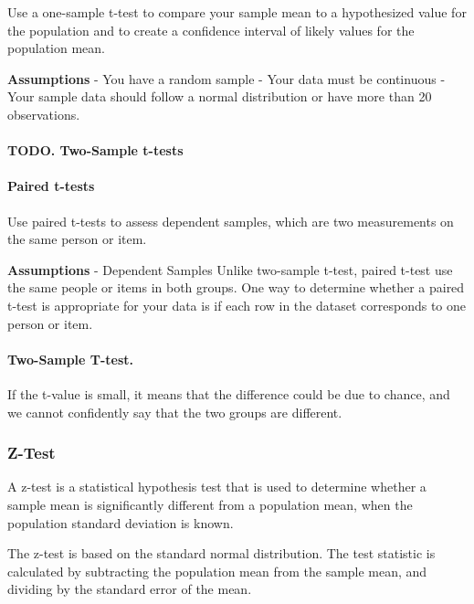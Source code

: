 \documentclass[11pt]{article}
\begin{document}
Use a one-sample t-test to compare your sample mean to a hypothesized
value for the population and to create a confidence interval of likely
values for the population mean.

\textbf{Assumptions} - You have a random sample - Your data must be
continuous - Your sample data should follow a normal distribution or
have more than 20 observations.

\hypertarget{todo.-two-sample-t-tests}{%
\paragraph{TODO. Two-Sample t-tests}\label{todo.-two-sample-t-tests}}

\hypertarget{paired-t-tests}{%
\paragraph{Paired t-tests}\label{paired-t-tests}}

Use paired t-tests to assess dependent samples, which are two
measurements on the same person or item.

\textbf{Assumptions} - Dependent Samples Unlike two-sample t-test,
paired t-test use the same people or items in both groups. One way to
determine whether a paired t-test is appropriate for your data is if
each row in the dataset corresponds to one person or item.

\hypertarget{two-sample-t-test.}{%
\paragraph{Two-Sample T-test.}\label{two-sample-t-test.}}

If the t-value is small, it means that the difference could be due to
chance, and we cannot confidently say that the two groups are different.

\hypertarget{z-test}{%
\subsubsection{Z-Test}\label{z-test}}

A z-test is a statistical hypothesis test that is used to determine
whether a sample mean is significantly different from a population mean,
when the population standard deviation is known.

The z-test is based on the standard normal distribution. The test
statistic is calculated by subtracting the population mean from the
sample mean, and dividing by the standard error of the mean.
\end{document}
